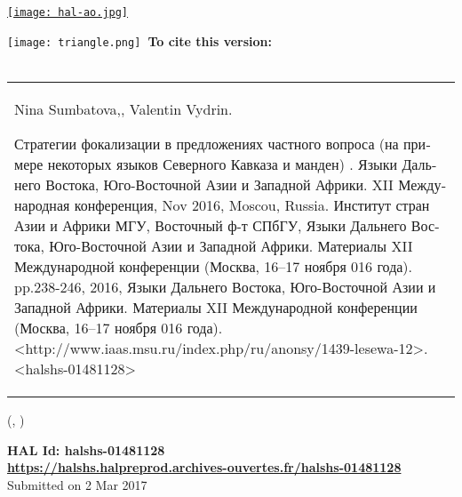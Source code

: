 \documentclass[11pt,a4paper]{article}
\newlength{\posXident}
\newlength{\posYident}
\begin{document}
\vspace*{0cm}
\begin{center}
\href{https://hal.archives-ouvertes.fr}{\texttt{[image: hal-ao.jpg]}} \\
\vfill
{}
\end{center}
\texttt{[image: triangle.png]}{\Large \textbf{~To cite this version:}} \\\\
\begin{tabular}{|p{\textwidth}}
{Nina Sumbatova,, Valentin Vydrin. \begin{russian}Стратегии фокализации в предложениях частного вопроса (на примере некоторых языков Северного Кавказа и манден) . Языки Дальнего Востока, Юго-Восточной Азии и Западной Африки. XII Международная конференция, Nov 2016, Moscou, Russia. Институт стран Азии и Африки МГУ, Восточный ф-т СПбГУ, Языки Дальнего Востока, Юго-Восточной Азии и Западной Африки. Материалы XII Международной конференции (Москва, 16--17 ноября 016 года). pp.238-246, 2016, Языки Дальнего Востока, Юго-Восточной Азии и Западной Африки. Материалы XII Международной конференции (Москва, 16--17 ноября 016 года). \textless{}http://www.iaas.msu.ru/index.php/ru/anonsy/1439-lesewa-12\textgreater{}. \textless{}halshs-01481128\textgreater{}\end{russian}} \\
\end{tabular}
\vfill
\begin{textblock*}{\textwidth}(\posXident , \posYident)
\begin{center}
\begin{doublespace}
{\Large \textbf{HAL Id: halshs-01481128}} \\
{\Large \textbf{\url{https://halshs.halpreprod.archives-ouvertes.fr/halshs-01481128}}} \\
Submitted on 2 Mar 2017
\end{doublespace}
\end{center}
\end{textblock*}
\end{document}
